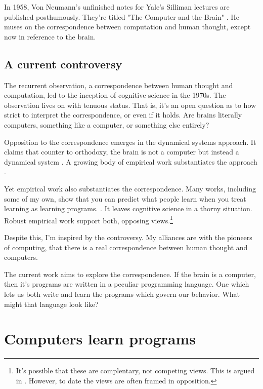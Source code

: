 In 1958, Von Neumann's unfinished notes for Yale's Silliman lectures are published posthumously. They're titled "The Computer and the Brain"  \cite{von2012computer}. He muses on the correspondence between computation and human thought, except now in reference to the brain. 

\subsection{A current controversy}

The recurrent observation, a correspondence between human thought and computation, led to the inception of cognitive science in the 1970s. The observation lives on with tenuous status. That is, it's an open question as to how strict to interpret the correspondence, or even if it holds. Are brains literally computers, something like a computer, or something else entirely?

Opposition to the correspondence emerges in the dynamical systems approach. It claims that counter to orthodoxy, the brain is not a computer but instead a dynamical system \cite{van1998dynamical}. A growing body of empirical work substantiates the approach \cite{mcclelland2010letting}.

Yet empirical work also substantiates the correspondence. Many works, including some of my own, show that you can predict what people learn when you treat learning as learning programs. \cite{griffiths2010probabilistic,  velez2017interpreting, lake2015human}. It leaves cognitive science in a thorny situation. Robust empirical work support both, opposing views.\footnote{It's possible that these are complentary, not competing views. This is argued in \cite{clark1997dynamical}. However, to date the views are often framed in opposition.}

Despite this, I'm inspired by the controversy. My alliances are with the pioneers of computing, that there is a real correspondence between human thought and computers. 

The current work aims to explore the correspondence. If the brain is a computer, then it's programs are written in a peculiar programming language. One which lets us both write and learn the programs which govern our behavior. What might that language look like?

\section{Computers learn programs}

